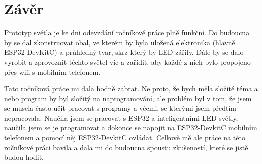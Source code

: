 \chapter{Závěr}
Prototyp světla je ke dni odevzdání ročníkové práce plně funkční. Do budoucna by se dal zkonstruovat obal, ve kterém by byla uložená elektronika (hlavně ESP32-DevKitC) a průhledný tvar, skrz který by LED zářily. Dále by se dalo vyrobit a zprovoznit těchto světel víc a zařídit, aby každé z nich bylo propojeno přes wifi s mobilním telefonem.


Tato ročníková práce mi dala hodně zabrat. Ne proto, že bych měla složité téma a nebo program by byl složitý na naprogramování, ale problém byl v tom, že jsem se musela často učit pracovat s programy a věcmi, se kterými jsem předtím nepracovala. Naučila jsem se pracovat s ESP32 a inteligentními LED světly, naučila jsem se je programovat a dokonce se napojit na ESP32-DevkitC mobilním telefonem a pomocí něj ESP32-DevkitC ovládat.
Celkově mě ale práce na této ročníkové práci bavila a dala mi do budoucna spoustu zkušeností, které se jistě budou hodit. 

